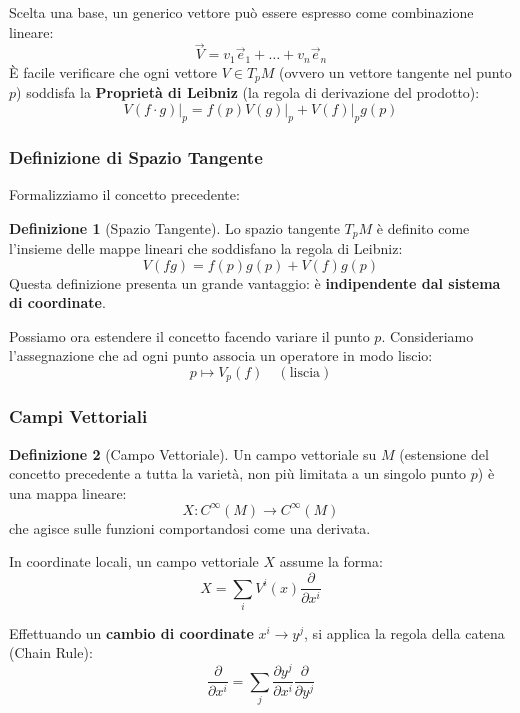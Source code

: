 \documentclass[openany]{book}
\theoremstyle{definition}
\newtheorem*{definizione}{Definizione}
\theoremstyle{remark}
\begin{document}
Scelta una base, un generico vettore può essere espresso come combinazione lineare:
\[
\vec{V} = v_1 \vec{e}_1 + \dots + v_n \vec{e}_n
\]
È facile verificare che ogni vettore $V \in T_p M$ (ovvero un vettore tangente nel punto $p$) soddisfa la \textbf{Proprietà di Leibniz} (la regola di derivazione del prodotto):
\begin{equation}
    V(f \cdot g)\big|_p = f(p) V(g)\big|_p + V(f)\big|_p g(p)
\end{equation}

\subsubsection*{Definizione di Spazio Tangente}
Formalizziamo il concetto precedente:
\begin{definizione}[Spazio Tangente]
    Lo spazio tangente $T_p M$ è definito come l'insieme delle mappe lineari che soddisfano la regola di Leibniz:
    \[
    V(fg) = f(p)g(p) + V(f)g(p) 
    \]
    Questa definizione presenta un grande vantaggio: è \textbf{indipendente dal sistema di coordinate}.
    
    Possiamo ora estendere il concetto facendo variare il punto $p$. Consideriamo l'assegnazione che ad ogni punto associa un operatore in modo liscio:
\[
p \longmapsto V_p(f) \quad (\text{liscia})
\]

\end{definizione}

\subsubsection*{Campi Vettoriali}

\begin{definizione}[Campo Vettoriale]
    Un campo vettoriale su $M$ (estensione del concetto precedente a tutta la varietà, non più limitata a un singolo punto $p$) è una mappa lineare:
    \[
    X : C^\infty(M) \to C^\infty(M)
    \]
    che agisce sulle funzioni comportandosi come una derivata.
\end{definizione}

In coordinate locali, un campo vettoriale $X$ assume la forma:
\begin{equation}
    X = \sum_i V^i(x) \frac{\partial}{\partial x^i}
\end{equation}

Effettuando un \textbf{cambio di coordinate} $x^i \to y^j$, si applica la regola della catena (Chain Rule):
\[
\frac{\partial}{\partial x^i} = \sum_j \frac{\partial y^j}{\partial x^i} \frac{\partial}{\partial y^j}
\]
\end{document}
